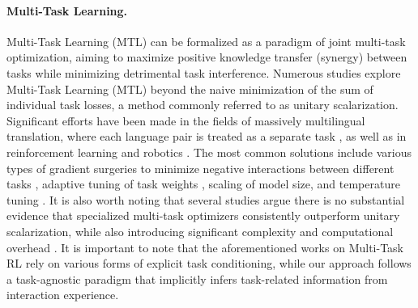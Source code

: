 \documentclass{article}
\theoremstyle{plain}
\theoremstyle{definition}
\theoremstyle{remark}
\begin{document}
\paragraph{Multi-Task Learning.} Multi-Task Learning (MTL) can be formalized as a paradigm of joint multi-task optimization, aiming to maximize positive knowledge transfer (synergy) between tasks while minimizing detrimental task interference. Numerous studies explore Multi-Task Learning (MTL) beyond the naive minimization of the sum of individual task losses, a method commonly referred to as unitary scalarization. Significant efforts have been made in the fields of massively multilingual translation, where each language pair is treated as a separate task \cite{mccann2018naturallanguagedecathlonmultitask, radford2019language, wang2020gradientvaccineinvestigatingimproving, li2021robustoptimizationmultilingualtranslation}, as well as in reinforcement learning \cite{espeholt2018impalascalabledistributeddeeprl, hessel2018multitaskdeepreinforcementlearning, sodhani2021multitaskreinforcementlearningcontextbased, kumar2023offlineqlearningdiversemultitask} and robotics \cite{wulfmeier2020compositionaltransferhierarchicalreinforcement, wang2024scalingproprioceptivevisuallearningheterogeneous}. The most common solutions include various types of gradient surgeries to minimize negative interactions between different tasks \cite{wang2020gradientvaccineinvestigatingimproving, yu2020gradientsurgerymultitasklearning}, adaptive tuning of task weights \cite{sener2019multitasklearningmultiobjectiveoptimization, li2021robustoptimizationmultilingualtranslation}, scaling of model size, and temperature tuning \cite{shaham2023causescuresinterferencemultilingual}. It is also worth noting that several studies argue there is no substantial evidence that specialized multi-task optimizers consistently outperform unitary scalarization, while also introducing significant complexity and computational overhead \cite{xin2022currentmultitaskoptimizationmethods, kurin2023defenseunitaryscalarizationdeep}. It is important to note that the aforementioned works on Multi-Task RL rely on various forms of explicit task conditioning, while our approach follows a task-agnostic paradigm that implicitly infers task-related information from interaction experience.
\end{document}
